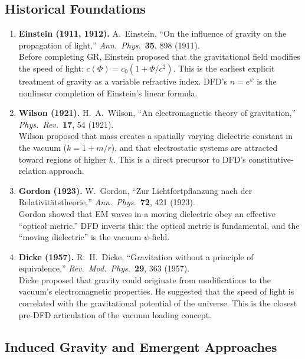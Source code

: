 \documentclass[11pt]{article}
\theoremstyle{plain}
\theoremstyle{definition}
\theoremstyle{remark}
\begin{document}
\subsection{Historical Foundations}

\begin{enumerate}

\item \textbf{Einstein (1911, 1912).}
A.~Einstein, ``On the influence of gravity on the propagation of light,''
\textit{Ann.\ Phys.}\ \textbf{35}, 898 (1911).\\
Before completing GR, Einstein proposed that the gravitational field
modifies the speed of light: $c(\Phi) = c_0(1 + \Phi/c^2)$. This is
the earliest explicit treatment of gravity as a variable refractive
index. DFD's $n = e^\psi$ is the nonlinear completion of Einstein's
linear formula.

\item \textbf{Wilson (1921).}
H.~A.~Wilson, ``An electromagnetic theory of gravitation,''
\textit{Phys.\ Rev.}\ \textbf{17}, 54 (1921).\\
Wilson proposed that mass creates a spatially varying dielectric constant
in the vacuum ($k = 1 + m/r$), and that electrostatic systems are
attracted toward regions of higher $k$. This is a direct precursor to
DFD's constitutive-relation approach.

\item \textbf{Gordon (1923).}
W.~Gordon, ``Zur Lichtfortpflanzung nach der Relativit\"atstheorie,''
\textit{Ann.\ Phys.}\ \textbf{72}, 421 (1923).\\
Gordon showed that EM waves in a moving dielectric obey an effective
``optical metric.'' DFD inverts this: the optical metric is fundamental,
and the ``moving dielectric'' is the vacuum $\psi$-field.

\item \textbf{Dicke (1957).}
R.~H.~Dicke, ``Gravitation without a principle of equivalence,''
\textit{Rev.\ Mod.\ Phys.}\ \textbf{29}, 363 (1957).\\
Dicke proposed that gravity could originate from modifications to the
vacuum's electromagnetic properties. He suggested that the speed of light
is correlated with the gravitational potential of the universe. This is
the closest pre-DFD articulation of the vacuum loading concept.

\end{enumerate}

\subsection{Induced Gravity and Emergent Approaches}
\end{document}
